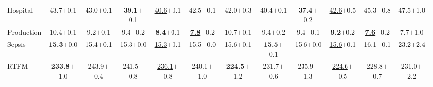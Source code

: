 \begin{table}[t]
\begin{adjustbox}{max width=\textwidth}
\begin{tabular}{@{}lccccc|ccccc|c@{}}
Hospital & 43.7{\scriptsize$\pm$0.1} & 43.0{\scriptsize$\pm$0.1} & \textbf{39.1}{\scriptsize$\pm$0.1} & \underline{40.6}{\scriptsize$\pm$0.1} & 42.5{\scriptsize$\pm$0.1} & 42.0{\scriptsize$\pm$0.3} & 40.4{\scriptsize$\pm$0.1} & \textbf{37.4}{\scriptsize$\pm$0.2} & \underline{42.6}{\scriptsize$\pm$0.5} & 45.3{\scriptsize$\pm$0.8} & 47.5{\scriptsize$\pm$1.0} \\
Production & 10.4{\scriptsize$\pm$0.1} & 9.2{\scriptsize$\pm$0.1} & 9.4{\scriptsize$\pm$0.2} & \textbf{8.4}{\scriptsize$\pm$0.1} & \underline{\textbf{7.8}}{\scriptsize$\pm$0.2} & 10.7{\scriptsize$\pm$0.1} & 9.4{\scriptsize$\pm$0.2} & 9.4{\scriptsize$\pm$0.1} & \textbf{9.2}{\scriptsize$\pm$0.2} & \underline{\textbf{7.6}}{\scriptsize$\pm$0.2} & 7.7{\scriptsize$\pm$1.0} \\
Sepsis & \textbf{15.3}{\scriptsize$\pm$0.0} & 15.4{\scriptsize$\pm$0.1} & 15.3{\scriptsize$\pm$0.0} & \underline{15.3}{\scriptsize$\pm$0.1} & 15.5{\scriptsize$\pm$0.0} & 15.6{\scriptsize$\pm$0.1} & \textbf{15.5}{\scriptsize$\pm$0.1} & 15.6{\scriptsize$\pm$0.0} & \underline{15.6}{\scriptsize$\pm$0.1} & 16.1{\scriptsize$\pm$0.1} & 23.2{\scriptsize$\pm$2.4} \\
RTFM & \textbf{233.8}{\scriptsize$\pm$1.0} & 243.9{\scriptsize$\pm$0.4} & 241.5{\scriptsize$\pm$0.8} & \underline{236.1}{\scriptsize$\pm$0.8} & 240.1{\scriptsize$\pm$1.0} & \textbf{224.5}{\scriptsize$\pm$1.2} & 231.7{\scriptsize$\pm$0.6} & 235.9{\scriptsize$\pm$1.3} & \underline{224.6}{\scriptsize$\pm$0.5} & 228.8{\scriptsize$\pm$0.7} & 231.0{\scriptsize$\pm$2.2} \\
\bottomrule
\end{tabular}
\end{adjustbox}
\end{table}

